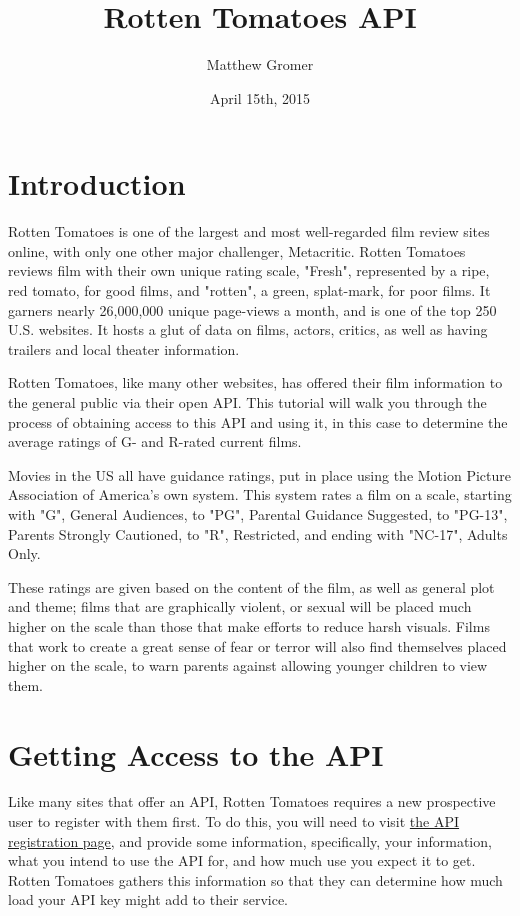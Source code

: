 \documentclass{article}
\begin{document}



\title{Rotten Tomatoes API}
\date{April 15th, 2015}
\author{Matthew Gromer}
\maketitle

\section*{Introduction}
Rotten Tomatoes is one of the largest and most well-regarded film review sites online, with only one other major challenger, Metacritic. Rotten Tomatoes reviews film with their own unique rating scale, "Fresh", represented by a ripe, red tomato, for good films, and "rotten", a green, splat-mark, for poor films. It garners nearly 26,000,000 unique page-views a month, and is one of the top 250 U.S. websites. It hosts a glut of data on films, actors, critics, as well as having trailers and local theater information.

Rotten Tomatoes, like many other websites, has offered their film information to the general public via their open API. This tutorial will walk you through the process of obtaining access to this API and using it, in this case to determine the average ratings of G- and R-rated current films.

Movies in the US all have guidance ratings, put in place using the Motion Picture Association of America's own system. This system rates a film on a scale, starting with "G", General Audiences, to "PG", Parental Guidance Suggested, to "PG-13", Parents Strongly Cautioned, to "R", Restricted, and ending with "NC-17", Adults Only. 

These ratings are given based on the content of the film, as well as general plot and theme; films that are graphically violent, or sexual will be placed much higher on the scale than those that make efforts to reduce harsh visuals. Films that work to create a great sense of fear or terror will also find themselves placed higher on the scale, to warn parents against allowing younger children to view them.

\section*{Getting Access to the API}
Like many sites that offer an API, Rotten Tomatoes requires a new prospective user to register with them first. To do this, you will need to visit \href{http://developer.rottentomatoes.com/member/register}{the API registration page}, and provide some information, specifically, your information, what you intend to use the API for, and how much use you expect it to get. Rotten Tomatoes gathers this information so that they can determine how much load your API key might add to their service.
\end{document}
